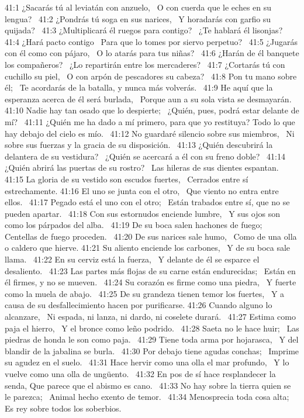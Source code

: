 41:1 ¿Sacarás tú al leviatán con anzuelo,  
O con cuerda que le eches en su lengua?  
41:2 ¿Pondrás tú soga en sus narices,  
Y horadarás con garfio su quijada?  
41:3 ¿Multiplicará él ruegos para contigo?  
¿Te hablará él lisonjas?  
41:4 ¿Hará pacto contigo  
Para que lo tomes por siervo perpetuo?  
41:5 ¿Jugarás con él como con pájaro,  
O lo atarás para tus niñas?  
41:6 ¿Harán de él banquete los compañeros?  
¿Lo repartirán entre los mercaderes?  
41:7 ¿Cortarás tú con cuchillo su piel,  
O con arpón de pescadores su cabeza?  
41:8 Pon tu mano sobre él;  
Te acordarás de la batalla, y nunca más volverás.  
41:9 He aquí que la esperanza acerca de él será burlada,  
Porque aun a su sola vista se desmayarán.  
41:10 Nadie hay tan osado que lo despierte;  
¿Quién, pues, podrá estar delante de mí?  
41:11 ¿Quién me ha dado a mí primero, para que yo restituya? 
Todo lo que hay debajo del cielo es mío.  
41:12 No guardaré silencio sobre sus miembros,  
Ni sobre sus fuerzas y la gracia de su disposición.  
41:13 ¿Quién descubrirá la delantera de su vestidura?  
¿Quién se acercará a él con su freno doble?  
41:14 ¿Quién abrirá las puertas de su rostro?  
Las hileras de sus dientes espantan.  
41:15 La gloria de su vestido son escudos fuertes,  
Cerrados entre sí estrechamente. 
41:16 El uno se junta con el otro,  
Que viento no entra entre ellos.  
41:17 Pegado está el uno con el otro;  
Están trabados entre sí, que no se pueden apartar.  
41:18 Con sus estornudos enciende lumbre,  
Y sus ojos son como los párpados del alba.  
41:19 De su boca salen hachones de fuego;  
Centellas de fuego proceden.  
41:20 De sus narices sale humo,  
Como de una olla o caldero que hierve. 
41:21 Su aliento enciende los carbones,  
Y de su boca sale llama.  
41:22 En su cerviz está la fuerza,  
Y delante de él se esparce el desaliento.  
41:23 Las partes más flojas de su carne están endurecidas;  
Están en él firmes, y no se mueven.  
41:24 Su corazón es firme como una piedra,  
Y fuerte como la muela de abajo.  
41:25 De su grandeza tienen temor los fuertes,  
Y a causa de su desfallecimiento hacen por purificarse. 
41:26 Cuando alguno lo alcanzare,  
Ni espada, ni lanza, ni dardo, ni coselete durará.  
41:27 Estima como paja el hierro,  
Y el bronce como leño podrido.  
41:28 Saeta no le hace huir;  
Las piedras de honda le son como paja.  
41:29 Tiene toda arma por hojarasca,  
Y del blandir de la jabalina se burla.  
41:30 Por debajo tiene agudas conchas;  
Imprime su agudez en el suelo.  
41:31 Hace hervir como una olla el mar profundo,  
Y lo vuelve como una olla de ungüento.  
41:32 En pos de sí hace resplandecer la senda, 
Que parece que el abismo es cano.  
41:33 No hay sobre la tierra quien se le parezca;  
Animal hecho exento de temor.  
41:34 Menosprecia toda cosa alta;  
Es rey sobre todos los soberbios.  
